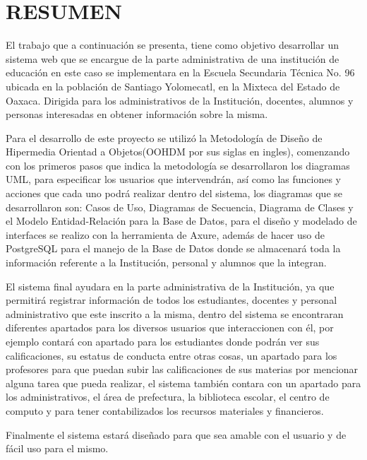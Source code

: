 \section*{RESUMEN}

{\large El trabajo que a continuación se presenta, tiene como objetivo desarrollar un sistema web que se encargue de la parte administrativa de una institución de educación en este caso se implementara en la Escuela Secundaria Técnica No. 96 ubicada en la población de Santiago Yolomecatl, en la Mixteca del Estado de Oaxaca. Dirigida para los administrativos de la Institución, docentes, alumnos y personas interesadas en obtener información sobre la misma.}\\
\vspace{0.5cm}

{\large Para el desarrollo de este proyecto se utilizó la Metodología de Diseño de Hipermedia Orientad a Objetos(OOHDM por sus siglas en ingles), comenzando con los primeros pasos que indica la metodología se desarrollaron los diagramas UML, para especificar los usuarios que intervendrán, así como las funciones y acciones que cada uno podrá realizar dentro del sistema, los diagramas que se desarrollaron son: Casos de Uso, Diagramas de Secuencia, Diagrama de Clases y el Modelo Entidad-Relación para la Base de Datos, para el diseño y modelado de interfaces se realizo con la herramienta de Axure, además de hacer uso de PostgreSQL para el manejo de la Base de Datos donde se almacenará toda la información referente a la Institución, personal y alumnos que la integran. }\\
\vspace{0.5cm}

{\large El sistema final ayudara en la parte administrativa de la Institución, ya que permitirá registrar información de todos los estudiantes, docentes y personal administrativo que este inscrito a la misma, dentro del sistema se encontraran diferentes apartados para los diversos usuarios que interaccionen con él, por ejemplo contará con apartado para los estudiantes donde podrán ver sus calificaciones, su estatus de conducta entre otras cosas, un apartado para los profesores para que puedan subir las calificaciones de sus materias por mencionar alguna tarea que pueda realizar, el sistema también contara con un apartado para los administrativos, el área de prefectura, la biblioteca escolar, el centro de computo y para tener contabilizados los recursos materiales y financieros.}\\
\vspace{0.5cm}

{\large Finalmente el sistema estará diseñado para que sea amable con el usuario y de fácil uso para el mismo.}\\


